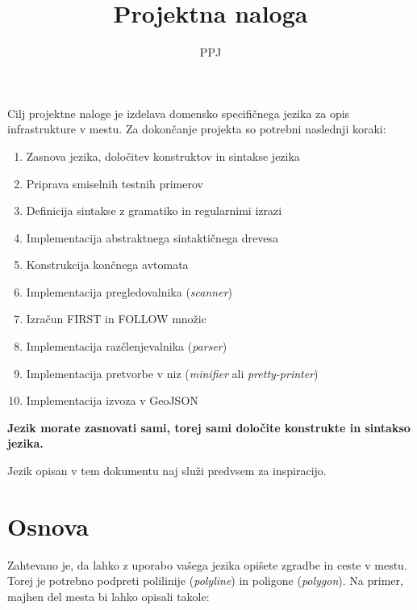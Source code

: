 \documentclass{article}
\title{Projektna naloga}
\author{PPJ}
\begin{document}
\maketitle

Cilj projektne naloge je izdelava domensko specifičnega jezika za opis infrastrukture v mestu.
Za dokončanje projekta so potrebni naslednji koraki:

\begin{enumerate}
\item Zasnova jezika, določitev konstruktov in sintakse jezika
\item Priprava smiselnih testnih primerov
\item Definicija sintakse z gramatiko in regularnimi izrazi
\item Implementacija abstraktnega sintaktičnega drevesa
\item Konstrukcija končnega avtomata
\item Implementacija pregledovalnika (\emph{scanner})
\item Izračun \textsc{FIRST} in \textsc{FOLLOW} množic
\item Implementacija razčlenjevalnika (\emph{parser})
\item Implementacija pretvorbe v niz (\emph{minifier} ali \emph{pretty-printer})
\item Implementacija izvoza v GeoJSON
\end{enumerate}

\textbf{Jezik morate zasnovati sami, torej sami določite konstrukte in sintakso jezika.}

Jezik opisan v tem dokumentu naj služi predvsem za inspiracijo.

\newpage
\section{Osnova}
Zahtevano je, da lahko z uporabo vašega jezika opišete zgradbe in ceste v mestu.
Torej je potrebno podpreti polilinije (\emph{polyline}) in poligone (\emph{polygon}).
Na primer, majhen del mesta bi lahko opisali takole:
\end{document}
